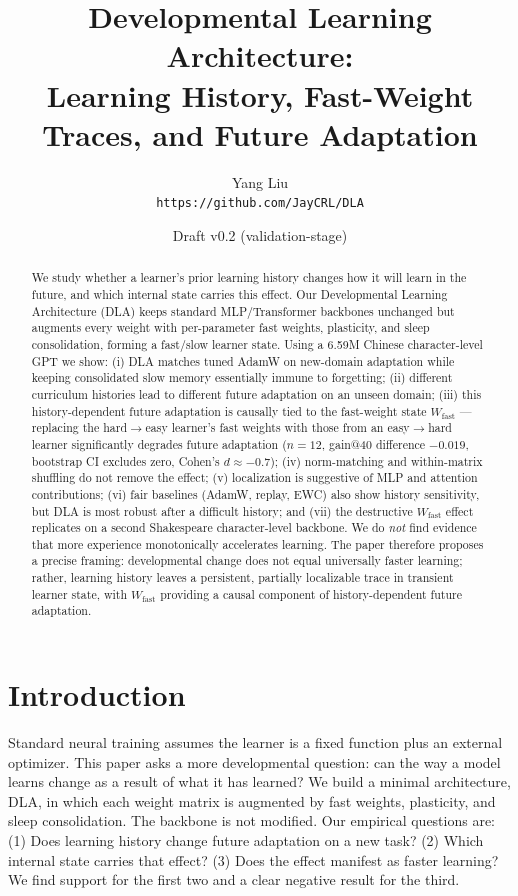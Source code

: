 \documentclass[11pt]{article}
\title{\bfseries Developmental Learning Architecture:\\[2pt]
Learning History, Fast-Weight Traces, and Future Adaptation}
\author{Yang Liu\\ \texttt{https://github.com/JayCRL/DLA}}
\date{Draft v0.2 (validation-stage)}
\newcommand{\Wfast}{W_{\mathrm{fast}}}
\begin{document}
\maketitle

\begin{abstract}
We study whether a learner's prior learning history changes how it will learn in the future, and which internal state carries this effect. Our Developmental Learning Architecture (DLA) keeps standard MLP/Transformer backbones unchanged but augments every weight with per-parameter fast weights, plasticity, and sleep consolidation, forming a fast/slow learner state. Using a 6.59M Chinese character-level GPT we show: (i) DLA matches tuned AdamW on new-domain adaptation while keeping consolidated slow memory essentially immune to forgetting; (ii) different curriculum histories lead to different future adaptation on an unseen domain; (iii) this history-dependent future adaptation is causally tied to the fast-weight state $\Wfast$ --- replacing the hard$\to$easy learner's fast weights with those from an easy$\to$hard learner significantly degrades future adaptation ($n{=}12$, gain@40 difference $-0.019$, bootstrap CI excludes zero, Cohen's $d\approx-0.7$); (iv) norm-matching and within-matrix shuffling do not remove the effect; (v) localization is suggestive of MLP and attention contributions; (vi) fair baselines (AdamW, replay, EWC) also show history sensitivity, but DLA is most robust after a difficult history; and (vii) the destructive $\Wfast$ effect replicates on a second Shakespeare character-level backbone. We do \emph{not} find evidence that more experience monotonically accelerates learning. The paper therefore proposes a precise framing: developmental change does not equal universally faster learning; rather, learning history leaves a persistent, partially localizable trace in transient learner state, with $\Wfast$ providing a causal component of history-dependent future adaptation.
\end{abstract}

\section{Introduction}
Standard neural training assumes the learner is a fixed function plus an external optimizer. This paper asks a more developmental question: can the way a model learns change as a result of what it has learned? We build a minimal architecture, DLA, in which each weight matrix is augmented by fast weights, plasticity, and sleep consolidation. The backbone is not modified.
Our empirical questions are: (1) Does learning history change future adaptation on a new task? (2) Which internal state carries that effect? (3) Does the effect manifest as faster learning? We find support for the first two and a clear negative result for the third.
\end{document}
